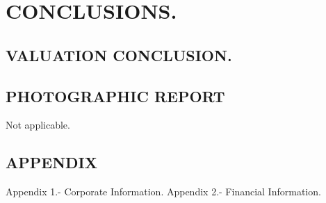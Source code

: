\documentclass[10pt,letter]{report}
\begin{document}
\chapter{CONCLUSIONS.}\label{cap:6}
\thispagestyle{fancy}
\setcounter{section}{16}
\section{VALUATION CONCLUSION.}\label{sec:p}


\section{PHOTOGRAPHIC REPORT}\label{sec:q}
Not applicable.
\section{APPENDIX}\label{sec:r}

Appendix 1.- Corporate Information. Appendix 2.- Financial Information.



\label{lastpage}
\end{document}
